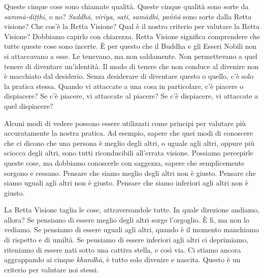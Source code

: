 Queste cinque cose sono chiamate qualità. Queste cinque qualità sono
sorte da \emph{sammā-diṭṭhi}, o no? \emph{Saddhā}, \emph{viriya},
\emph{sati}, \emph{samādhi}, \emph{paññā} sono sorte dalla Retta
visione? Che cos'è la Retta Visione? Qual è il nostro criterio per
valutare la Retta Visione? Dobbiamo capirlo con chiarezza. Retta Visione
significa comprendere che tutte queste cose sono incerte. È per questo
che il Buddha e gli Esseri Nobili non si attaccavano a esse. Le
tenevano, ma non saldamente. Non permettevano a quel tenere di diventare
un'identità. Il modo di tenere che non conduce al divenire non è
macchiato dal desiderio. Senza desiderare di diventare questo o quello,
c'è solo la pratica stessa. Quando vi attaccate a una cosa in
particolare, c'è piacere o dispiacere? Se c'è piacere, vi attaccate al
piacere? Se c'è dispiacere, vi attaccate a quel dispiacere?

Alcuni modi di vedere possono essere utilizzati come principi per
valutare più accuratamente la nostra pratica. Ad esempio, sapere che
quei modi di conoscere che ci dicono che una persona è meglio degli
altri, o uguale agli altri, oppure più sciocca degli altri, sono tutti
riconducibili all'errata visione. Possiamo percepirle queste cose, ma
dobbiamo conoscerle con saggezza, sapere che semplicemente sorgono e
cessano. Pensare che siamo meglio degli altri non è giusto. Pensare che
siamo uguali agli altri non è giusto. Pensare che siamo inferiori agli
altri non è giusto.

La Retta Visione taglia le cose, attraversandole tutte. In quale
direzione andiamo, allora? Se pensiamo di essere meglio degli altri
sorge l'orgoglio. È lì, ma non lo vediamo. Se pensiamo di essere uguali
agli altri, quando è il momento manchiamo di rispetto e di umiltà. Se
pensiamo di essere inferiori agli altri ci deprimiamo, riteniamo di
essere nati sotto una cattiva stella, e così via. Ci stiamo ancora
aggrappando ai cinque \emph{khandhā}, è tutto solo divenire e nascita.
Questo è un criterio per valutare noi stessi.

